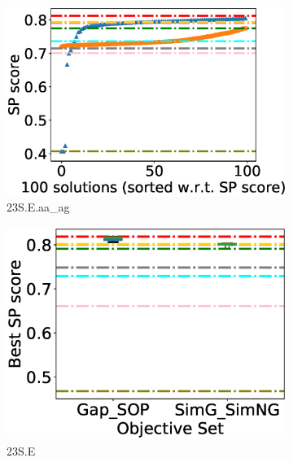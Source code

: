\begin{figure}[!htbp]
\begin{adjustwidth}{-0.5cm}{-0.5cm}
\begin{subfigure}{0.25\textwidth}
			\includegraphics[width=\columnwidth]{Figure/summary/precomputedInit/23S.E.aa_ag/pairs_density_single_run}
			\caption{23S.E.aa\_ag}
\end{subfigure}
		\begin{subfigure}{0.25\textwidth}
			\includegraphics[width=\columnwidth]{Figure/summary/precomputedInit/23S.E/objset_pairs_rank}
			\caption{23S.E}
\end{subfigure}    
		\begin{subfigure}{0.25\textwidth}

\end{subfigure}
\end{adjustwidth}
\end{figure}
